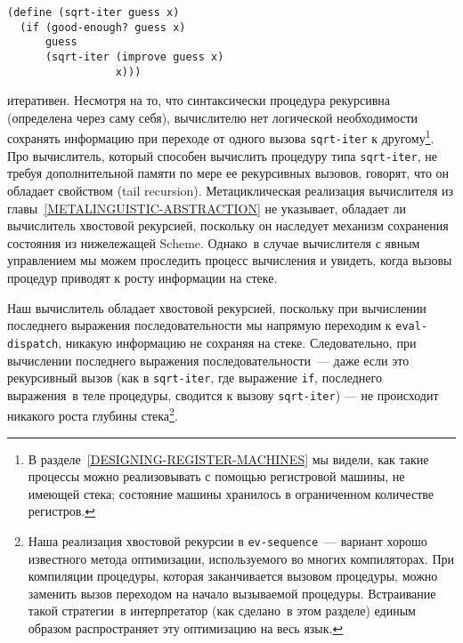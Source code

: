 \begin{Verbatim}[fontsize=\small]
(define (sqrt-iter guess x)
  (if (good-enough? guess x)
      guess
      (sqrt-iter (improve guess x)
                 x)))
\end{Verbatim}
итеративен.  Несмотря на то, что синтаксически процедура рекурсивна
(определена через саму себя), вычислителю нет логической
необходимости сохранять информацию при переходе от одного вызова
{\tt sqrt-iter} к другому\footnote{В 
разделе~\ref{DESIGNING-REGISTER-MACHINES} мы видели, как такие
процессы можно реализовывать с помощью регистровой машины, не имеющей стека; 
состояние машины хранилось в ограниченном количестве регистров.
}. %
Про вычислитель, который способен вычислить процедуру типа 
{\tt sqrt-iter}, не требуя дополнительной памяти по мере ее
рекурсивных вызовов, говорят, что он обладает свойством 
% 
 (tail recursion).
Метациклическая
реализация вычислителя из 
главы~\ref{METALINGUISTIC-ABSTRACTION} не указывает, обладает ли
вычислитель хвостовой рекурсией, поскольку он наследует механизм
сохранения состояния из нижележащей Scheme.  Однако~в случае
вычислителя с явным управлением мы можем проследить процесс вычисления
и увидеть, когда вызовы процедур приводят к росту информации на
стеке.

Наш вычислитель обладает хвостовой рекурсией, поскольку
при вычислении последнего выражения последовательности мы напрямую
переходим к {\tt eval-dispatch}, никакую информацию не сохраняя
на стеке.  Следовательно, при вычислении последнего выражения
последовательности~--- даже если это рекурсивный вызов (как в
{\tt sqrt-iter}, где выражение {\tt if}, последнего
выражения~в теле процедуры, сводится к вызову {\tt sqrt-iter})
--- не происходит никакого роста глубины стека\footnote{Наша реализация хвостовой рекурсии в
{\tt ev-sequence}~--- вариант хорошо известного метода
оптимизации, используемого во многих компиляторах.  При компиляции
процедуры, которая заканчивается вызовом процедуры, можно заменить
вызов переходом на начало вызываемой процедуры.  Встраивание такой
стратегии~в интерпретатор (как сделано~в этом разделе) единым
образом распространяет эту оптимизацию на весь язык.
}.

